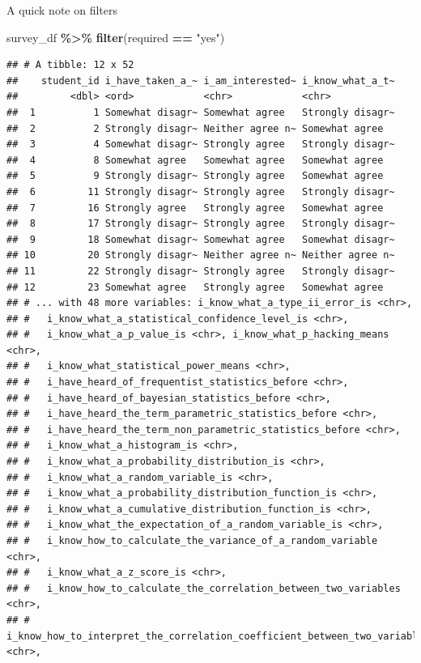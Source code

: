 \documentclass[
]{book}
\newenvironment{Shaded}{\begin{snugshade}}{\end{snugshade}}
\newcommand{\KeywordTok}[1]{\textcolor[rgb]{0.13,0.29,0.53}{\textbf{#1}}}
\newcommand{\NormalTok}[1]{#1}
\newcommand{\OperatorTok}[1]{\textcolor[rgb]{0.81,0.36,0.00}{\textbf{#1}}}
\newcommand{\StringTok}[1]{\textcolor[rgb]{0.31,0.60,0.02}{#1}}
\begin{document}
A quick note on filters

\begin{Shaded}
\begin{Highlighting}[]
\NormalTok{survey\_df }\OperatorTok{\%\textgreater{}\%}\StringTok{ }\KeywordTok{filter}\NormalTok{(required }\OperatorTok{==}\StringTok{ "yes"}\NormalTok{)}
\end{Highlighting}
\end{Shaded}

\begin{verbatim}
## # A tibble: 12 x 52
##    student_id i_have_taken_a_~ i_am_interested~ i_know_what_a_t~
##         <dbl> <ord>            <chr>            <chr>           
##  1          1 Somewhat disagr~ Somewhat agree   Strongly disagr~
##  2          2 Strongly disagr~ Neither agree n~ Somewhat agree  
##  3          4 Somewhat disagr~ Strongly agree   Strongly disagr~
##  4          8 Somewhat agree   Somewhat agree   Somewhat agree  
##  5          9 Strongly disagr~ Strongly agree   Somewhat agree  
##  6         11 Strongly disagr~ Strongly agree   Strongly disagr~
##  7         16 Strongly agree   Strongly agree   Somewhat agree  
##  8         17 Strongly disagr~ Strongly agree   Strongly disagr~
##  9         18 Somewhat disagr~ Somewhat agree   Somewhat disagr~
## 10         20 Strongly disagr~ Neither agree n~ Neither agree n~
## 11         22 Strongly disagr~ Strongly agree   Strongly disagr~
## 12         23 Somewhat agree   Strongly agree   Somewhat agree  
## # ... with 48 more variables: i_know_what_a_type_ii_error_is <chr>,
## #   i_know_what_a_statistical_confidence_level_is <chr>,
## #   i_know_what_a_p_value_is <chr>, i_know_what_p_hacking_means <chr>,
## #   i_know_what_statistical_power_means <chr>,
## #   i_have_heard_of_frequentist_statistics_before <chr>,
## #   i_have_heard_of_bayesian_statistics_before <chr>,
## #   i_have_heard_the_term_parametric_statistics_before <chr>,
## #   i_have_heard_the_term_non_parametric_statistics_before <chr>,
## #   i_know_what_a_histogram_is <chr>,
## #   i_know_what_a_probability_distribution_is <chr>,
## #   i_know_what_a_random_variable_is <chr>,
## #   i_know_what_a_probability_distribution_function_is <chr>,
## #   i_know_what_a_cumulative_distribution_function_is <chr>,
## #   i_know_what_the_expectation_of_a_random_variable_is <chr>,
## #   i_know_how_to_calculate_the_variance_of_a_random_variable <chr>,
## #   i_know_what_a_z_score_is <chr>,
## #   i_know_how_to_calculate_the_correlation_between_two_variables <chr>,
## #   i_know_how_to_interpret_the_correlation_coefficient_between_two_variables <chr>,

\end{verbatim}
\end{document}
